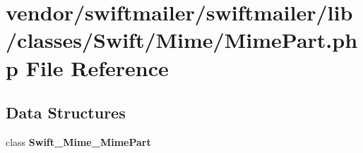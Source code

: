 \section{vendor/swiftmailer/swiftmailer/lib/classes/\+Swift/\+Mime/\+Mime\+Part.php File Reference}
\label{_mime_2_mime_part_8php}
\subsection*{Data Structures}
\begin{DoxyCompactItemize}
\item 
class {\bf Swift\+\_\+\+Mime\+\_\+\+Mime\+Part}
\end{DoxyCompactItemize}
